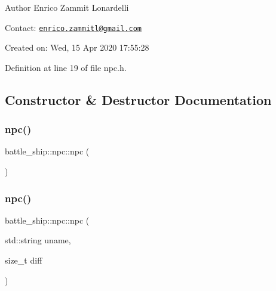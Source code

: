 \begin{DoxyAuthor}{Author}
Enrico Zammit Lonardelli
\end{DoxyAuthor}
Contact\+: \href{mailto:enrico.zammitl@gmail.com}{\tt enrico.\+zammitl@gmail.\+com}

Created on\+: Wed, 15 Apr 2020 17\+:55\+:28 

Definition at line 19 of file npc.\+h.



\subsection{Constructor \& Destructor Documentation}
\mbox{\label{classbattle__ship_1_1npc_ab92a83aba6dbf1060ebdb666087790b8}} 
\subsubsection{\texorpdfstring{npc()}{npc()}\hspace{0.1cm}{\footnotesize\ttfamily [1/2]}}
{\footnotesize\ttfamily battle\+\_\+ship\+::npc\+::npc (\begin{DoxyParamCaption}{ }\end{DoxyParamCaption})\hspace{0.3cm}{\ttfamily [default]}}

\mbox{\label{classbattle__ship_1_1npc_a6a5c77aa108694177865edb9c2d06947}} 
\subsubsection{\texorpdfstring{npc()}{npc()}\hspace{0.1cm}{\footnotesize\ttfamily [2/2]}}
{\footnotesize\ttfamily battle\+\_\+ship\+::npc\+::npc (\begin{DoxyParamCaption}\item[{std\+::string}]{uname,  }\item[{size\+\_\+t}]{diff }\end{DoxyParamCaption})\hspace{0.3cm}{\ttfamily [inline]}}



